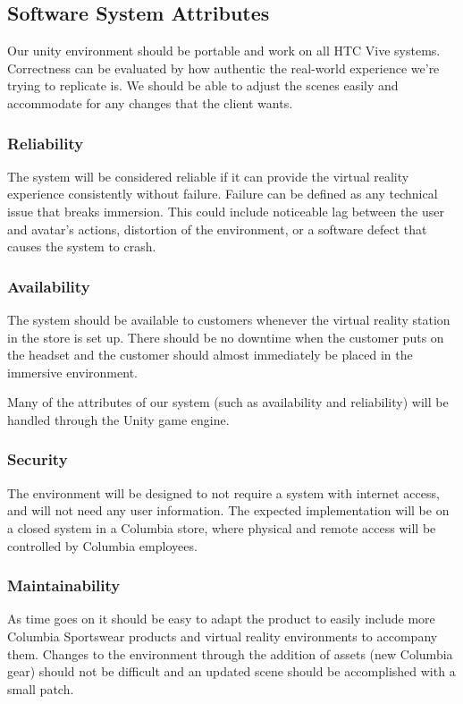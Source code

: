 \documentclass[10pt,journal,compsoc,onecolumn, draftclsnofoot]{IEEEtran}
\begin{document}
\subsection{Software System Attributes}
Our unity environment should be portable and work on all HTC Vive systems.
Correctness can be evaluated by how authentic the real-world experience we're
trying to replicate is. We should be able to adjust the scenes easily and
accommodate for any changes that the client wants.

\subsubsection{Reliability}
The system will be considered reliable if it can provide the virtual reality
experience consistently without failure. Failure can be defined as any technical
issue that breaks immersion. This could include noticeable lag between the user
and avatar's actions, distortion of the environment, or a software defect that
causes the system to crash.

\subsubsection{Availability}
The system should be available to customers whenever the virtual reality station
in the store is set up. There should be no downtime when the customer puts on
the headset and the customer should almost immediately be placed in the immersive
environment.

Many of the attributes of our system (such as availability and reliability)
will be handled through the Unity game engine.

\subsubsection{Security}
The environment will be designed to not require a system with internet access,
and will not need any user information. The expected implementation will be on
a closed system in a Columbia store, where physical and remote access will be
controlled by Columbia employees.

\subsubsection{Maintainability}
As time goes on it should be easy to adapt the product to easily include more
Columbia Sportswear products and virtual reality environments to accompany them.
Changes to the environment through the addition of assets (new Columbia gear)
should not be difficult and an updated scene should be accomplished with a small patch.
\end{document}
